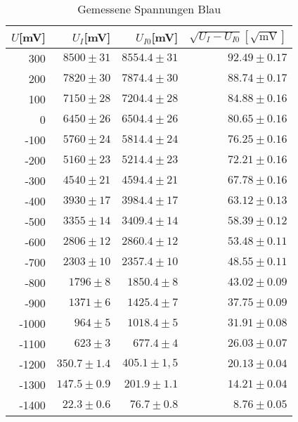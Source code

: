 \begin{table}[h]
  \centering
  \caption{Gemessene Spannungen Blau}
    \begin{tabular}{r | r | r | r}
    \toprule
    $U$[mV] & $U_I$[mV] & $U_{I0}$[mV] & $\sqrt{U_I  - U_{I0}}[\sqrt{\text{mV}}]$\\
    \midrule
    300   & $8500 \pm  31$ &$ 8554.4 \pm 31$ & $92.49 \pm 0.17$ \\
    200   & $7820 \pm 30$ & $7874.4 \pm 30$ &$ 88.74  \pm0.17$ \\
    100   & $7150 \pm28$ &$ 7204.4 \pm 28$ & $84.88 \pm0.16$\\
    0     & $6450 \pm 26$ & $6504.4 \pm 26$ & $80.65  \pm0.16$ \\
    -100  & $5760 \pm 24$ & $5814.4 \pm 24$ & $76.25 \pm 0.16$ \\
    -200  & $5160 \pm 23$ & $5214.4 \pm 23$ & $72.21 \pm 0.16$\\
    -300  & $4540 \pm 21$ & $4594.4 \pm 21$ & $67.78 \pm 0.16$ \\
    -400  & $3930 \pm 17$ & $3984.4 \pm 17$ & $63.12 \pm0.13$ \\
    -500  & $3355 \pm 14$ & $3409.4 \pm 14$ & $58.39 \pm0.12$ \\
    -600  & $2806 \pm 12$ & $2860.4 \pm 12$ & $53.48 \pm 0.11$ \\
    -700  & $2303 \pm 10$ & $2357.4 \pm 10$ &$ 48.55 \pm 0.11$ \\
    -800  &$ 1796 \pm 8$& $1850.4 \pm 8$ &$ 43.02  \pm0.09$ \\
    -900  & $1371\pm 6 $& $1425.4 \pm 7$ & $37.75  \pm0.09$ \\
    -1000 & $964 \pm 5$ & $1018.4 \pm 5 $& $31.91 \pm 0.08$ \\
    -1100 & $623 \pm 3$ & $677.4 \pm 4$ & $26.03 \pm0.07$\\
    -1200 & $350.7  \pm1.4$ & $405.1 \pm 1,5$ &$ 20.13 \pm 0.04$ \\
    -1300 & $147.5 \pm 0.9$ & $201.9 \pm 1.1$& $14.21 \pm0.04$ \\
    -1400 & $22.3  \pm 0.6$ & $76.7  \pm 0.8$ & $8.76 \pm 0.05$ \\
    \bottomrule
    \end{tabular}%
\end{table}%

